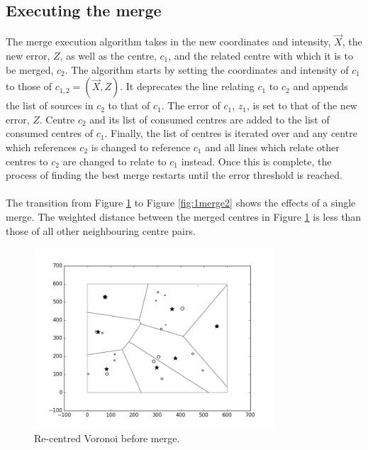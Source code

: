 \subsection{Executing the merge}
The merge execution algorithm takes in the new coordinates and intensity, $\vec{X}$, the new error, $Z$, as well as the centre, $c_1$, and the related centre with which it is to be merged, $c_2$. The algorithm starts by setting the coordinates and intensity of $c_1$ to those of $c_{1,2} = (\vec{X},Z)$. It deprecates the line relating $c_1$ to $c_2$ and appends the list of sources in $c_2$ to that of $c_1$. The error of $c_1$, $z_1$, is set to that of the new error, $Z$. Centre $c_2$ and its list of consumed centres are added to the list of consumed centres of $c_1$. Finally, the list of centres is iterated over and any centre which references $c_2$ is changed to reference $c_1$ and all lines which relate other centres to $c_2$ are changed to relate to $c_1$ instead. Once this is complete, the process of finding the best merge restarts until the error threshold is reached.
\\
\\
The transition from Figure \ref{fig:1merge1} to Figure \ref{fig:1merge2} shows the effects of a single merge. The weighted distance between the merged centres in Figure \ref{fig:1merge1} is less than those of all other neighbouring centre pairs.
\begin{figure}[H]
  \centering
  \includegraphics[width=0.8\textwidth]{Images/1merge1.png}
  \caption{Re-centred Voronoi before merge.}
  \label{fig:1merge1}
\end{figure}
